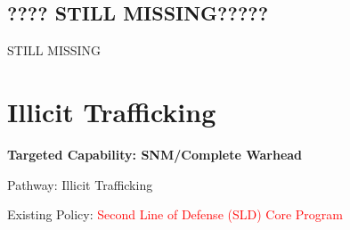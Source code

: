 \documentclass{report}
\begin{document}
\subsection{???? STILL MISSING?????}

STILL MISSING



% 
% 








\section{Illicit Trafficking} \label{sec:Trafficking}


\bfseries Targeted Capability: SNM/Complete Warhead 

Pathway: Illicit Trafficking 

Existing Policy: \textcolor{red}{Second Line of Defense (SLD) Core Program} 
\end{document}
